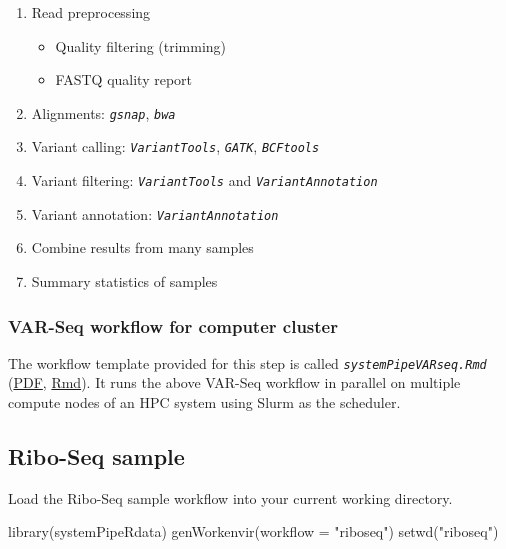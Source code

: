 \documentclass[14pt,]{article}
\providecommand{\tightlist}{%
  \setlength{\itemsep}{0pt}\setlength{\parskip}{0pt}}
\newcommand{\hlstr}[1]{\textcolor[rgb]{0.251,0.627,0.251}{#1}}%
\newcommand{\hlstd}[1]{\textcolor[rgb]{0.251,0.251,0.251}{#1}}%
\newcommand{\hlkwc}[1]{\textcolor[rgb]{0.251,0.251,0.251}{#1}}%
\newcommand{\hlkwd}[1]{\textcolor[rgb]{0.878,0.439,0.125}{#1}}%
\newenvironment{Shaded}{\begin{myshaded}}{\end{myshaded}}
\newcommand{\KeywordTok}[1]{\hlkwd{#1}}
\newcommand{\DataTypeTok}[1]{\hlkwc{#1}}
\newcommand{\StringTok}[1]{\hlstr{#1}}
\newcommand{\NormalTok}[1]{\hlstd{#1}}
\begin{document}
\begin{enumerate}
\def\labelenumi{\arabic{enumi}.}
\tightlist
\item
  Read preprocessing

  \begin{itemize}
  \tightlist
  \item
    Quality filtering (trimming)
  \item
    FASTQ quality report
  \end{itemize}
\item
  Alignments: \emph{\texttt{gsnap}}, \emph{\texttt{bwa}}
\item
  Variant calling: \emph{\texttt{VariantTools}}, \emph{\texttt{GATK}}, \emph{\texttt{BCFtools}}
\item
  Variant filtering: \emph{\texttt{VariantTools}} and \emph{\texttt{VariantAnnotation}}
\item
  Variant annotation: \emph{\texttt{VariantAnnotation}}
\item
  Combine results from many samples
\item
  Summary statistics of samples
\end{enumerate}

\hypertarget{var-seq-workflow-for-computer-cluster}{%
\subsubsection{VAR-Seq workflow for computer cluster}\label{var-seq-workflow-for-computer-cluster}}

The workflow template provided for this step is called \emph{\texttt{systemPipeVARseq.Rmd}} (\href{https://github.com/tgirke/systemPipeRdata/blob/master/inst/extdata/workflows/varseq/systemPipeVARseq.pdf?raw=true}{PDF}, \href{https://github.com/tgirke/systemPipeRdata/blob/master/inst/extdata/workflows/varseq/systemPipeVARseq.Rmd}{Rmd}).
It runs the above VAR-Seq workflow in parallel on multiple compute nodes of an HPC system using Slurm as the scheduler.

\hypertarget{ribo-seq-sample}{%
\subsection{Ribo-Seq sample}\label{ribo-seq-sample}}

Load the Ribo-Seq sample workflow into your current working directory.

\begin{Shaded}
\begin{Highlighting}[]
\KeywordTok{library}\NormalTok{(systemPipeRdata)}
\KeywordTok{genWorkenvir}\NormalTok{(}\DataTypeTok{workflow =} \StringTok{"riboseq"}\NormalTok{)}
\KeywordTok{setwd}\NormalTok{(}\StringTok{"riboseq"}\NormalTok{)}
\end{Highlighting}
\end{Shaded}
\end{document}
